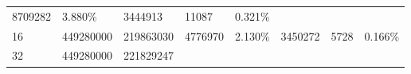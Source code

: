 \documentclass[11pt]{article}
\begin{document}
\begin{longtable}[]{@{}llllllll@{}}
\begin{minipage}[t]{0.09\columnwidth}
8709282\strut
\end{minipage} & \begin{minipage}[t]{0.09\columnwidth}\raggedright\strut
3.880\%\strut
\end{minipage} & \begin{minipage}[t]{0.09\columnwidth}\raggedright\strut
3444913\strut
\end{minipage} & \begin{minipage}[t]{0.10\columnwidth}\raggedright\strut
11087\strut
\end{minipage} & \begin{minipage}[t]{0.10\columnwidth}\raggedright\strut
0.321\%\strut
\end{minipage}\tabularnewline
\begin{minipage}[t]{0.14\columnwidth}\raggedright\strut
16\strut
\end{minipage} & \begin{minipage}[t]{0.10\columnwidth}\raggedright\strut
449280000\strut
\end{minipage} & \begin{minipage}[t]{0.08\columnwidth}\raggedright\strut
219863030\strut
\end{minipage} & \begin{minipage}[t]{0.09\columnwidth}\raggedright\strut
4776970\strut
\end{minipage} & \begin{minipage}[t]{0.09\columnwidth}\raggedright\strut
2.130\%\strut
\end{minipage} & \begin{minipage}[t]{0.09\columnwidth}\raggedright\strut
3450272\strut
\end{minipage} & \begin{minipage}[t]{0.10\columnwidth}\raggedright\strut
5728\strut
\end{minipage} & \begin{minipage}[t]{0.10\columnwidth}\raggedright\strut
0.166\%\strut
\end{minipage}\tabularnewline
\begin{minipage}[t]{0.14\columnwidth}\raggedright\strut
32\strut
\end{minipage} & \begin{minipage}[t]{0.10\columnwidth}\raggedright\strut
449280000\strut
\end{minipage} & \begin{minipage}[t]{0.08\columnwidth}\raggedright\strut
221829247\strut
\end{minipage} & \begin{minipage}[t]{0.09\columnwidth}\raggedright\strut

\end{minipage}
\end{longtable}
\end{document}
